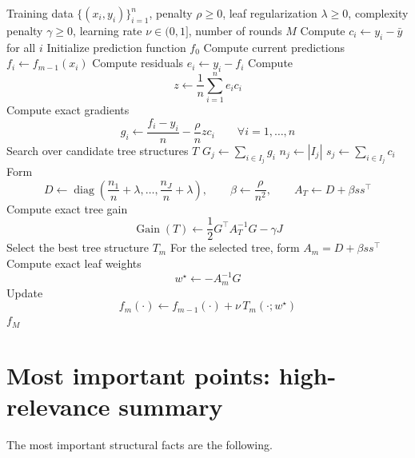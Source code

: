 \documentclass[11pt]{article}
\newcommand{\1}{\mathbf{1}}
\newcommand{\diag}{\operatorname{diag}}
\begin{document}
\begin{algorithm}[h!]
\caption{Exact Newton-style tree boosting with squared covariance penalty}
\begin{algorithmic}[1]
\Require Training data $\{(x_i,y_i)\}_{i=1}^n$, penalty $\rho \ge 0$, leaf regularization $\lambda \ge 0$, complexity penalty $\gamma \ge 0$, learning rate $\nu \in (0,1]$, number of rounds $M$
\State Compute $c_i \gets y_i - \bar y$ for all $i$
\State Initialize prediction function $f_0$
    \State Compute current predictions $f_i \gets f_{m-1}(x_i)$
    \State Compute residuals $e_i \gets y_i - f_i$
    \State Compute
    \[
    z \gets \frac{1}{n}\sum_{i=1}^n e_i c_i
    \]
    \State Compute exact gradients
    \[
    g_i \gets \frac{f_i-y_i}{n} - \frac{\rho}{n} z c_i
    \qquad \forall i=1,\dots,n
    \]
    \State Search over candidate tree structures $T$
            \State $G_j \gets \sum_{i \in I_j} g_i$
            \State $n_j \gets |I_j|$
            \State $s_j \gets \sum_{i \in I_j} c_i$
        \EndFor
        \State Form
        \[
        D \gets \diag\!\left(\frac{n_1}{n}+\lambda,\dots,\frac{n_J}{n}+\lambda\right),
        \qquad
        \beta \gets \frac{\rho}{n^2},
        \qquad
        A_T \gets D + \beta ss^\top
        \]
        \State Compute exact tree gain
        \[
        \operatorname{Gain}(T)
        \gets
        \frac{1}{2}G^\top A_T^{-1}G - \gamma J
        \]
    \EndFor
    \State Select the best tree structure $T_m$
    \State For the selected tree, form $A_m = D + \beta ss^\top$
    \State Compute exact leaf weights
    \[
    w^\star \gets -A_m^{-1}G
    \]
    \State Update
    \[
    f_m(\cdot) \gets f_{m-1}(\cdot) + \nu\,T_m(\cdot;w^\star)
    \]
\EndFor
\State \Return $f_M$
\end{algorithmic}
\end{algorithm}

\section{Most important points: high-relevance summary}

The most important structural facts are the following.
\end{document}
